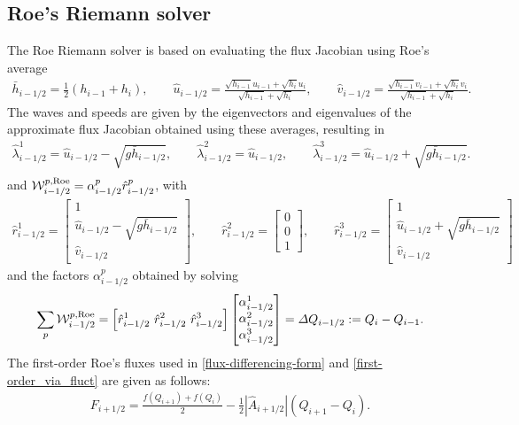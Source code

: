 \documentclass[preprint, 11pt]{article}
\newcommand{\W}{{\mathcal W}}
\newcommand{\imh}{{i-1/2}}
\newcommand{\bff}{{f}}
\newcommand{\bfr}{{r}}
\newcommand{\bfF}{{F}}
\newcommand{\bfq}{{Q}}
\newcommand{\Roe}{{\rm Roe}}
\begin{document}
\subsection{Roe's Riemann solver} \label{sec:roe}
The Roe Riemann solver is based on evaluating the flux Jacobian using Roe's average
\begin{align}\label{roe_average}
  \bar h_{i-1/2}=\frac{1}{2}(h_{i-1}+h_i), \qquad
  \hat u_{i-1/2}=\frac{\sqrt{h_{i-1}}u_{i-1}+\sqrt{h_i}u_i}{\sqrt{h_{i-1}}+\sqrt{h_i}}, \qquad
  \hat v_{i-1/2}=\frac{\sqrt{h_{i-1}}v_{i-1}+\sqrt{h_i}v_i}{\sqrt{h_{i-1}}+\sqrt{h_i}}.
\end{align}
The waves and speeds are given by the eigenvectors and eigenvalues of the approximate
flux Jacobian obtained using these averages, resulting in
\begin{align*}
  \hat\lambda_{i-1/2}^1=\hat u_{i-1/2}-\sqrt{g\bar h_{i-1/2}}, \qquad
  \hat\lambda_{i-1/2}^2=\hat u_{i-1/2}, \qquad
  \hat\lambda_{i-1/2}^3=\hat u_{i-1/2}+\sqrt{g\bar h_{i-1/2}}. \\
\end{align*}
and $\W_{i-1/2}^{p,\Roe}=\alpha_{i-1/2}^p\hat r_{i-1/2}^p$, with
\begin{align*}
  \hat \bfr^1_{i-1/2} =
  \begin{bmatrix}
    1 \\
    \hat u_{i-1/2}-\sqrt{g\bar h_{i-1/2}}\\
    \hat v_{i-1/2}
  \end{bmatrix},
  \qquad
  \hat \bfr^2_{i-1/2} =
  \begin{bmatrix}
    0\\
    0\\
    1
  \end{bmatrix},
  \qquad
  \hat \bfr^3_{i-1/2} =
  \begin{bmatrix}
    1 \\
    \hat u_{i-1/2}+\sqrt{g\bar h_{i-1/2}}\\
    \hat v_{i-1/2}
  \end{bmatrix}
\end{align*}
and the factors $\alpha^p_\imh$ obtained by solving
\begin{align}\label{system_for_alphas}
  \sum_p\W_{i-1/2}^{p,\Roe} = \left[\hat \bfr^1_{i-1/2} ~\hat \bfr^2_{i-1/2} ~\hat \bfr^3_{i-1/2}\right]
  \begin{bmatrix}
    \alpha^1_{i-1/2} \\
    \alpha^2_{i-1/2} \\
    \alpha^3_{i-1/2}
  \end{bmatrix}
  =\Delta Q_{i-1/2}:=\bfq_i-\bfq_{i-1}.
\end{align}
{\color{red}
  The first-order Roe's fluxes used in \eqref{flux-differencing-form} and \eqref{first-order_via_fluct} are given as follows:
  \begin{align}\label{first-order_fluxes_Roe}
    \bfF_{i+1/2} = \frac{\bff(\bfq_{i+1})+\bff(\bfq_i)}{2} - \frac{1}{2} |\hat A_{i+1/2}|(\bfq_{i+1}-\bfq_{i}).
  \end{align}
}
\end{document}
